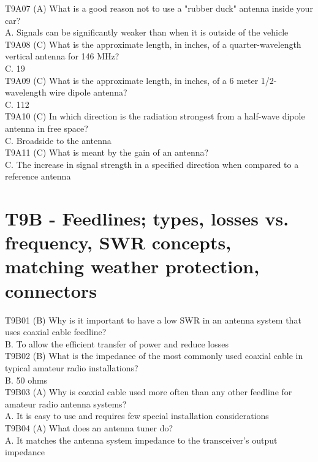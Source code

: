 \documentclass[12pt,letterpaper]{report}
\begin{document}
T9A07 (A) What is a good reason not to use a "rubber duck" antenna inside your car?\\
A. Signals can be significantly weaker than when it is outside of the vehicle\\

T9A08 (C) What is the approximate length, in inches, of a quarter-wavelength vertical antenna for 146 MHz?\\
C. 19\\

T9A09 (C) What is the approximate length, in inches, of a 6 meter 1/2-wavelength wire dipole antenna?\\
C. 112\\

T9A10 (C) In which direction is the radiation strongest from a half-wave dipole antenna in free space?\\
C. Broadside to the antenna\\

T9A11 (C) What is meant by the gain of an antenna?\\
C. The increase in signal strength in a specified direction when compared to a reference antenna\\

\section{T9B - Feedlines; types, losses vs. frequency, SWR concepts, matching weather protection, connectors}

T9B01 (B) Why is it important to have a low SWR in an antenna system that uses coaxial cable feedline?\\
B. To allow the efficient transfer of power and reduce losses\\

T9B02 (B) What is the impedance of the most commonly used coaxial cable in typical amateur radio installations?\\
B. 50 ohms\\

T9B03 (A) Why is coaxial cable used more often than any other feedline for amateur radio antenna systems?\\
A. It is easy to use and requires few special installation considerations\\

T9B04 (A) What does an antenna tuner do?\\
A. It matches the antenna system impedance to the transceiver's output impedance\\
\end{document}
